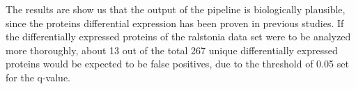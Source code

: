 The results are show us that the output of the pipeline is biologically plausible, since the proteins differential expression has been proven in previous studies. If the differentially expressed proteins of the ralstonia data set were to be analyzed more thoroughly, about 13 out of the total 267 unique  differentially expressed proteins would be expected to be false positives, due to the threshold of 0.05 set for the q-value.
